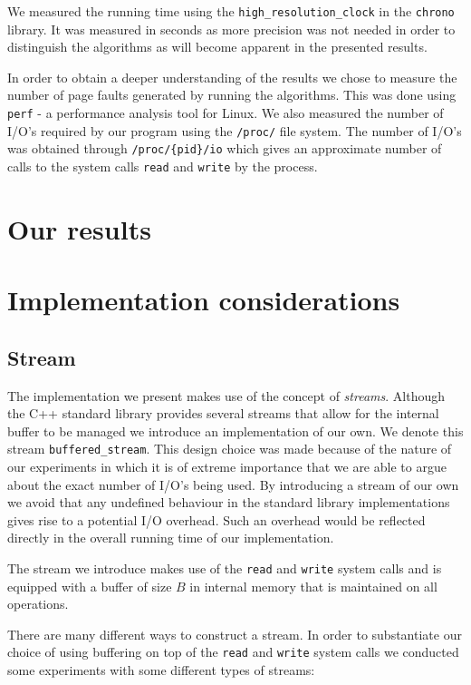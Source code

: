 \documentclass[twoside,11pt,openright]{report}
\begin{document}
We measured the running time using the \texttt{high\_resolution\_clock} in the \texttt{chrono} library. It was measured in seconds as more precision was not needed in order to distinguish the algorithms as will become apparent in the presented results.

In order to obtain a deeper understanding of the results we chose to measure the number of page faults generated by running the algorithms. This was done using \texttt{perf} - a performance analysis tool for Linux. We also measured the number of I/O's required by our program using the \texttt{/proc/} file system. The number of I/O's was obtained through \texttt{/proc/\{pid\}/io} which gives an approximate number of calls to the system calls \texttt{read} and \texttt{write} by the process.

\chapter{Our results}

\chapter{Implementation considerations}

\section{Stream}
The implementation we present makes use of the concept of \textit{streams}. Although the C++ standard library provides several streams that allow for the internal buffer to be managed we introduce an implementation of our own. We denote this stream \texttt{buffered\_stream}. This design choice was made because of the nature of our experiments in which it is of extreme importance that we are able to argue about the exact number of I/O's being used. By introducing a stream of our own we avoid that any undefined behaviour in the standard library implementations gives rise to a potential I/O overhead. Such an overhead would be reflected directly in the overall running time of our implementation.

The stream we introduce makes use of the \texttt{read} and \texttt{write} system calls and is equipped with a buffer of size $B$ in internal memory that is maintained on all operations.

There are many different ways to construct a stream. In order to substantiate our choice of using buffering on top of the \texttt{read} and \texttt{write} system calls we conducted some experiments with some different types of streams:
\end{document}
